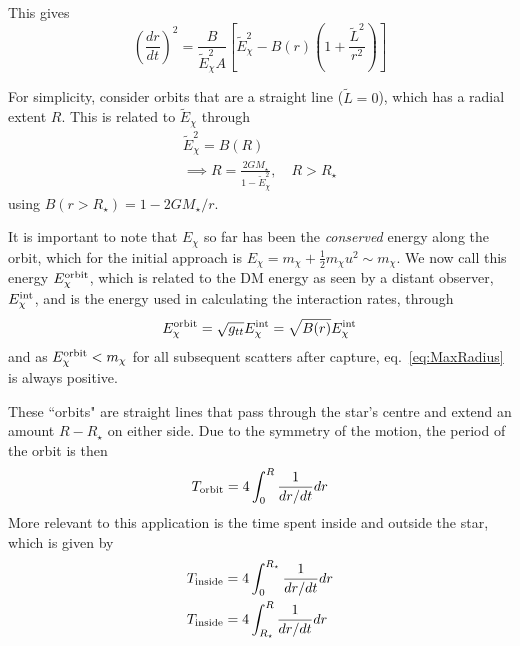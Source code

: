 This gives
\begin{equation}
    \left (\frac{dr}{dt} \right)^2 = \frac{B}{\tilde E_\chi^2 A} \left[\tilde E_\chi^2- B(r) \left(  1 + \frac{\tilde L^2}{r^2} \right) \right]\label{eq:drdt2GR}
\end{equation}


For simplicity, consider orbits that are a straight line ($\tilde L = 0$), which has a radial extent $R$. This is related to $\tilde E_\chi$ through
\begin{gather}
    \tilde E_\chi^2 = B(R)\label{eq:maxradgeneral}\\
    \implies R = \frac{2 G M_\star}{1 - \tilde E_\chi^2}, \quad R>R_\star
    \label{eq:MaxRadius}
\end{gather}
using $B(r>R_\star) = 1 - 2 G M_\star /r$.

It is important to note that $E_\chi$ so far has been the \textit{conserved} energy along the orbit, 
which for the initial approach is $E_\chi = m_\chi + \frac{1}{2}m_\chi u^2\sim m_\chi$. 
We now call this energy $E_\chi^{\rm orbit}$, which is related to the DM energy as seen by a distant observer, $E_\chi^{\rm int}$, 
and is the energy used in calculating the interaction rates, through 
\begin{equation}
    E_\chi^{\rm orbit} = \sqrt{g_{tt}} E_\chi^{\rm int} = \sqrt{B(r)}E_\chi^{\rm int}
\end{equation}
and as $E_\chi^{\rm orbit} < m_\chi$ for all subsequent scatters after capture, eq.~\ref{eq:MaxRadius} is always positive.

These ``orbits" are straight lines that pass through the star's centre and extend an amount $R - R_\star$ on either side. 
Due to the symmetry of the motion, the period of the orbit is then
\begin{equation}
    T_{\rm orbit} = 4 \int_0^R \frac{1}{dr/dt}dr
\end{equation}
More relevant to this application is the time spent inside and outside the star, which is given by
\begin{align}
    T_{\rm inside} & = 4 \int_0^{R_\star} \frac{1}{dr/dt}dr\label{eq:timeinside}\\
    T_{\rm inside} & = 4 \int_{R_\star}^R \frac{1}{dr/dt}dr\label{eq:timeoutside}
\end{align}

